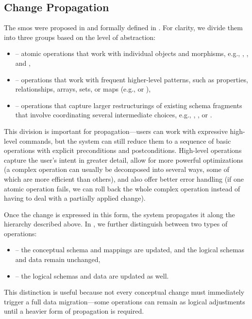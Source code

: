\subsection{Change Propagation}
\label{sec:evolution-propagation}

The \acrshort{smo}s were proposed in  and formally defined in . For clarity, we divide them into three groups based on the level of abstraction:
\begin{itemize}
    \item {} -- atomic operations that work with individual objects and morphisms, e.g., , , and ,
    \item {} -- operations that work with frequent higher-level patterns, such as properties, relationships, arrays, sets, or maps (e.g.,  or ),
    \item {} -- operations that capture larger restructurings of existing schema fragments that involve coordinating several intermediate choices, e.g., , , or .
\end{itemize}
This division is important for propagation---users can work with expressive high-level commands, but the system can still reduce them to a sequence of basic operations with explicit preconditions and postconditions. High-level operations capture the user's intent in greater detail, allow for more powerful optimizations (a complex operation can usually be decomposed into several ways, some of which are more efficient than others), and also offer better error handling (if one atomic operation fails, we can roll back the whole complex operation instead of having to deal with a partially applied change).

Once the change is expressed in this form, the system propagates it along the hierarchy described above. In , we further distinguish between two types of operations:
\begin{itemize}
    \item {} -- the conceptual schema and mappings are updated, and the logical schemas and data remain unchanged,
    \item {} -- the logical schemas and data are updated as well.
\end{itemize}
This distinction is useful because not every conceptual change must immediately trigger a full data migration---some operations can remain as logical adjustments until a heavier form of propagation is required.

